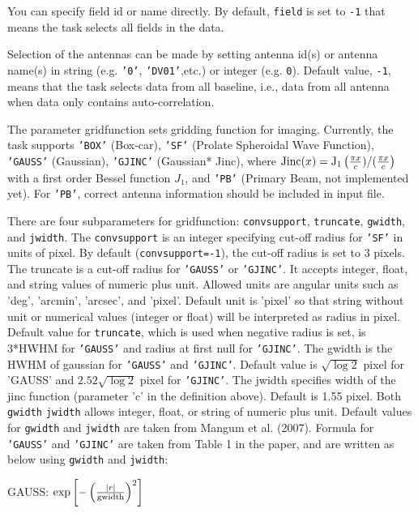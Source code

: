 You can specify field id or name directly. By default, {\tt field} is set 
to {\tt -1} that means the task selects all fields in the data.

Selection of the antennas can be made by setting antenna id(s) or 
antenna name(s) in string (e.g. {\tt '0'}, {\tt 'DV01'},etc.) or integer 
(e.g. {\tt 0}). Default value, {\tt -1}, means that the task selects data from 
all baseline, i.e., data from all antenna when data only contains 
auto-correlation.


The parameter gridfunction sets gridding function for imaging. 
Currently, the task supports {\tt 'BOX'} (Box-car), {\tt 'SF'} (Prolate 
Spheroidal Wave Function), {\tt 'GAUSS'} (Gaussian), {\tt 'GJINC'} (Gaussian*
Jinc), where 
${\rm Jinc}(x) = {\rm J}_1 \left( \frac{\pi x}{c})/(\frac{\pi x}{c} \right)$ 
with a first order 
Bessel function $J_1$, and {\tt 'PB'} (Primary Beam, not implemented yet). 
For {\tt 'PB'}, correct antenna information should be included in input 
file. 

There are four subparameters for gridfunction: {\tt convsupport}, {\tt truncate}, 
{\tt gwidth}, and {\tt jwidth}. The {\tt convsupport} is an integer specifying cut-off 
radius for {\tt 'SF'} in units of pixel. By default ({\tt convsupport=-1}), 
the cut-off radius is set to 3 pixels. The truncate is a cut-off 
radius for {\tt 'GAUSS'} or {\tt 'GJINC'}. It accepts integer, float, and 
string values of numeric plus unit. Allowed units are angular 
units such as 'deg', 'arcmin', 'arcsec', and 'pixel'. Default unit 
is 'pixel' so that string without unit or numerical values (integer 
or float) will be interpreted as radius in pixel. Default value 
for {\tt truncate}, which is used when negative radius is set, is 3*HWHM 
for {\tt 'GAUSS'} and radius at first null for {\tt 'GJINC'}. The gwidth is 
the HWHM of gaussian for {\tt 'GAUSS'} and {\tt 'GJINC'}. Default value is 
$\sqrt{\log 2}$ pixel for 'GAUSS' and $2.52 \sqrt{\log 2}$ pixel for 
{\tt 'GJINC'}. The jwidth specifies width of the jinc function (parameter 
'c' in the definition above). Default is 1.55 pixel. Both {\tt gwidth} 
{\tt jwidth} allows integer, float, or string of numeric plus unit. 
Default values for {\tt gwidth} and {\tt jwidth} are taken from Mangum et al. 
(2007). Formula for {\tt 'GAUSS'} and {\tt 'GJINC'} are taken from Table 1 in 
the paper, and are written as below using {\tt gwidth} and {\tt jwidth}: 


   GAUSS: $ \exp \left[ - \left( \frac{|r|}{\rm gwidth} \right)^2 \right] $


